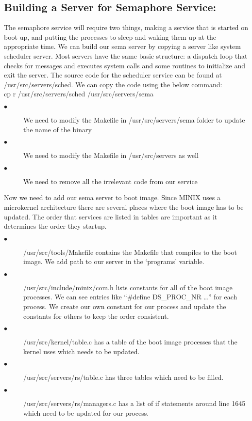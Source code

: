 \documentclass[a4paper,11pt,twocolumn]{article}
\begin{document}
\subsection{ Building a Server for Semaphore Service: }

The semaphore service will require two things, making a service that is started on boot up, and putting the processes to sleep and waking them up at the appropriate time. We can build our sema server by copying a server like system scheduler server. Most servers have the same basic structure: a dispatch loop that checks for messages and executes system calls and some routines to initialize and exit the server. The source code for the scheduler service can be found at /usr/src/servers/sched. We can copy the code using the below command:\\

cp r /usr/src/servers/sched /usr/src/servers/sema\\

\begin{description}
  \item[$\bullet$ ] We need to modify the Makefile in /usr/src/servers/sema folder to update the name of the binary
  \item[$\bullet$ ] We need to modify the Makefile in /usr/src/servers as well
  \item[$\bullet$ ] We need to remove all the irrelevant code from our service
\end{description}
Now we need to add our sema server to boot image. Since MINIX uses a microkernel architecture there are several places where the boot image has to be updated. The order that services are listed in tables are important as it determines the order they startup.

\begin{description}
  \item[$\bullet$ ] /usr/src/tools/Makefile contains the Makefile that compiles to the boot image. We add path to our server in the ‘programs’ variable.
  \item[$\bullet$ ] /usr/src/include/minix/com.h lists constants for all of the boot image processes. We can see entries like “\#define DS\_PROC\_NR …” for each process. We create our own constant for our process and update the constants for others to keep the order consistent.
  \item[$\bullet$ ] /usr/src/kernel/table.c has a table of the boot image processes that the kernel uses which needs to be updated.
  \item[$\bullet$ ] /usr/src/servers/rs/table.c has three tables which need to be filled.
  \item[$\bullet$ ] /usr/src/servers/rs/managers.c has a list of if statements around line 1645 which need to be updated for our process.
\end{description}
\end{document}
